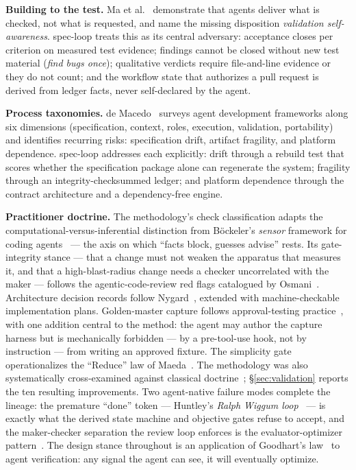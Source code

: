 \documentclass[11pt]{article}
\begin{document}
\textbf{Building to the test.} Ma et al.~\cite{ma2026building} demonstrate
that agents deliver what is checked, not what is requested, and name the
missing disposition \emph{validation self-awareness}. spec-loop treats this as
its central adversary: acceptance closes per criterion on measured test
evidence; findings cannot be closed without new test material (\emph{find bugs
once}); qualitative verdicts require file-and-line evidence or they do not
count; and the workflow state that authorizes a pull request is derived from
ledger facts, never self-declared by the agent.

\textbf{Process taxonomies.} de Macedo~\cite{demacedo2026prompt} surveys agent
development frameworks along six dimensions (specification, context, roles,
execution, validation, portability) and identifies recurring risks:
specification drift, artifact fragility, and platform dependence. spec-loop
addresses each explicitly: drift through a rebuild test that scores whether
the specification package alone can regenerate the system; fragility through
an integrity-checksummed ledger; and platform dependence through the contract
architecture and a dependency-free engine.

\textbf{Practitioner doctrine.} The methodology's check classification adapts
the computational-versus-inferential distinction from B\"ockeler's
\emph{sensor} framework for coding agents~\cite{boeckeler2025sensors,fowler2023exploring}
--- the axis on which ``facts block, guesses advise'' rests. Its gate-integrity
stance --- that a change must not weaken the apparatus that measures it, and
that a high-blast-radius change needs a checker uncorrelated with the maker ---
follows the agentic-code-review red flags catalogued by Osmani~\cite{osmani2025agentic}.
Architecture decision records follow Nygard~\cite{nygard2011adr}, extended with
machine-checkable implementation plans. Golden-master capture follows
approval-testing practice~\cite{approvaltests}, with one addition central to the
method: the agent may author the capture harness but is mechanically forbidden
--- by a pre-tool-use hook, not by instruction --- from writing an approved
fixture. The simplicity gate operationalizes the ``Reduce'' law of
Maeda~\cite{maeda2006simplicity}. The methodology was also systematically
cross-examined against classical
doctrine~\cite{thomas2019pragmatic}; \S\ref{sec:validation} reports the ten
resulting improvements. Two agent-native failure modes complete the lineage:
the premature ``done'' token --- Huntley's \emph{Ralph Wiggum
loop}~\cite{huntley2025ralph} --- is exactly what the derived state machine and
objective gates refuse to accept, and the maker-checker separation the review
loop enforces is the evaluator-optimizer pattern~\cite{anthropic2024agents}.
The design stance throughout is an application of Goodhart's
law~\cite{strathern1997improving} to agent verification: any signal the agent
can see, it will eventually optimize.
\end{document}
